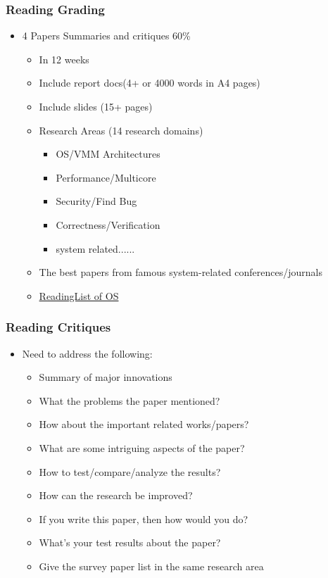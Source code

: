 \begin{frame}[plain]	
	\frametitle{Reading Grading}
	
	\begin{itemize}\Large
		\item 4 Papers Summaries and critiques 60\%
		\begin{itemize}\large
			\item In 12 weeks
			\item Include report docs(4+ or 4000 words in A4 pages) 
			\item Include slides (15+	pages)
			\item Research Areas (14 research domains)
			\begin{itemize}	\large
				\item OS/VMM Architectures
				\item Performance/Multicore
				\item Security/Find Bug
				\item Correctness/Verification
				\item system related......
			\end{itemize}		
			\item The best papers from famous system-related conferences/journals
			\item \href{https://github.com/chyyuu/aos\_course/blob/master/readinglist.md}{ReadingList of OS}			
		\end{itemize}
	\end{itemize}
	
	
\end{frame}

\begin{frame}[plain]	
	\frametitle{Reading Critiques}
	
	\begin{itemize}\Large
		\item Need to address the following:
		\begin{itemize}[<+->]\Large
			
			\item Summary of major innovations
			\item What the problems the paper mentioned?
			\item How about the important related works/papers?
			\item What are some intriguing aspects of the paper?
			\item How to test/compare/analyze the results?
			\item How can the research be improved?
			\item If you write this paper, then how would you do?
			\item What's your test results about the paper?
			\item Give the survey paper list in the same research area
			
		\end{itemize}
	\end{itemize}
	
	
\end{frame}

